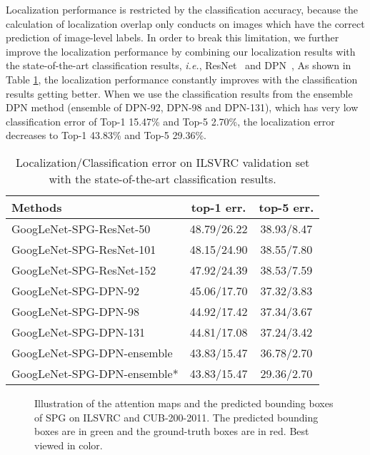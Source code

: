 \documentclass[runningheads]{llncs}
\newcommand{\ie}{\emph{i.e.}}
\begin{document}
Localization performance is restricted by the classification accuracy, because the calculation of localization overlap only conducts on images which have the correct prediction of image-level labels.
In order to break this limitation, we further improve the localization performance by combining our localization results with the state-of-the-art classification results, \ie, ResNet~\cite{he2016deep} and DPN~\cite{chen2017dual},
As shown in Table \ref{tab5}, the localization performance constantly improves with the classification results getting better.
When we use the classification results from the ensemble DPN method (ensemble of DPN-92, DPN-98 and DPN-131), which has very low classification error of Top-1 15.47\% and Top-5 2.70\%,
the localization error decreases to Top-1 43.83\%  and Top-5 29.36\%.
\begin{table}[t]\setlength{\tabcolsep}{6pt}
  \centering
\caption{Localization/Classification error on ILSVRC validation set with the state-of-the-art classification results.}\label{tab5}
  \begin{tabular}{l|c|c}
    \hline
    \hline
    Methods & top-1 err. & top-5 err. \\
    \hline
    GoogLeNet-SPG-ResNet-50 & 48.79/26.22 & 38.93/8.47 \\
    GoogLeNet-SPG-ResNet-101 & 48.15/24.90 & 38.55/7.80 \\
    GoogLeNet-SPG-ResNet-152 & 47.92/24.39 & 38.53/7.59 \\
    \hline
    GoogLeNet-SPG-DPN-92  & 45.06/17.70 & 37.32/3.83 \\
    GoogLeNet-SPG-DPN-98  & 44.92/17.42 & 37.34/3.67 \\
    GoogLeNet-SPG-DPN-131  & 44.81/17.08 & 37.24/3.42 \\
    GoogLeNet-SPG-DPN-ensemble  & 43.83/15.47 & 36.78/2.70 \\
    GoogLeNet-SPG-DPN-ensemble*  & 43.83/15.47 & 29.36/2.70 \\
    \hline
    \hline
  \end{tabular}
\end{table}

\begin{figure*}
  \centering
  \begin{subfigure}[ILSVRC]{
  	\centering
  	\texttt{[image: fig//imagenet-box.pdf]}
    }
  \end{subfigure}
  \begin{subfigure}[CUB-200-2011]{
  	\centering
  	\texttt{[image: fig//cub-box.pdf]}
    }
  \end{subfigure}
  \caption{Illustration of the attention maps and the predicted bounding boxes of SPG on ILSVRC and CUB-200-2011. The predicted bounding boxes are in green and the ground-truth boxes are in red. Best viewed in color.}\label{fig-box}
\end{figure*}
\end{document}
